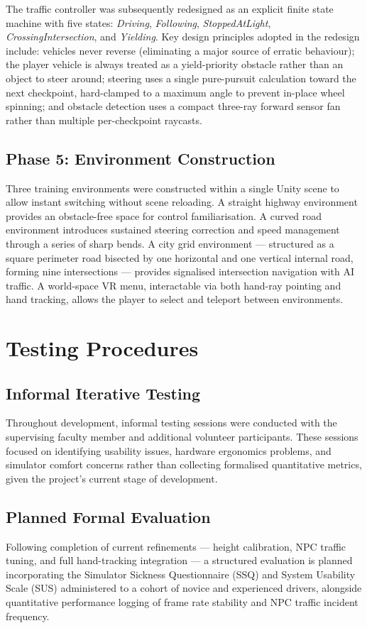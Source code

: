 The traffic controller was subsequently redesigned as an explicit finite state machine with five states: \textit{Driving}, \textit{Following}, \textit{StoppedAtLight}, \textit{CrossingIntersection}, and \textit{Yielding}. Key design principles adopted in the redesign include: vehicles never reverse (eliminating a major source of erratic behaviour); the player vehicle is always treated as a yield-priority obstacle rather than an object to steer around; steering uses a single pure-pursuit calculation toward the next checkpoint, hard-clamped to a maximum angle to prevent in-place wheel spinning; and obstacle detection uses a compact three-ray forward sensor fan rather than multiple per-checkpoint raycasts.

\subsection{Phase 5: Environment Construction}
Three training environments were constructed within a single Unity scene to allow instant switching without scene reloading. A straight highway environment provides an obstacle-free space for control familiarisation. A curved road environment introduces sustained steering correction and speed management through a series of sharp bends. A city grid environment — structured as a square perimeter road bisected by one horizontal and one vertical internal road, forming nine intersections — provides signalised intersection navigation with AI traffic. A world-space VR menu, interactable via both hand-ray pointing and hand tracking, allows the player to select and teleport between environments.

\section{Testing Procedures}

\subsection{Informal Iterative Testing}
Throughout development, informal testing sessions were conducted with the supervising faculty member and additional volunteer participants. These sessions focused on identifying usability issues, hardware ergonomics problems, and simulator comfort concerns rather than collecting formalised quantitative metrics, given the project's current stage of development.

\subsection{Planned Formal Evaluation}
Following completion of current refinements — height calibration, NPC traffic tuning, and full hand-tracking integration — a structured evaluation is planned incorporating the Simulator Sickness Questionnaire (SSQ) and System Usability Scale (SUS) administered to a cohort of novice and experienced drivers, alongside quantitative performance logging of frame rate stability and NPC traffic incident frequency.

